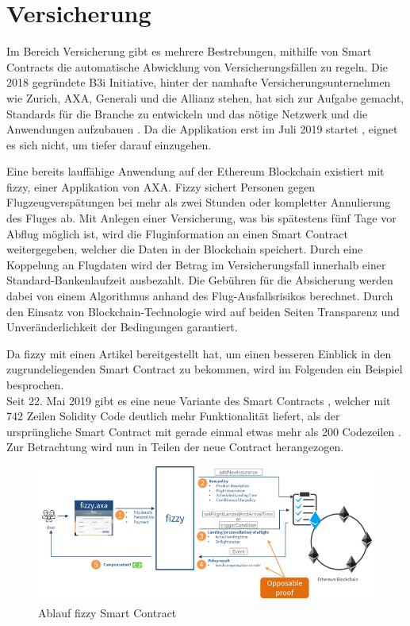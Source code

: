 \chapter{Versicherung}
\label{chap:Versicherung}
Im Bereich Versicherung gibt es mehrere Bestrebungen, mithilfe von Smart Contracts die automatische Abwicklung von Versicherungsfällen zu regeln. Die 2018 gegründete B3i Initiative, hinter der namhafte Versicherungsunternehmen wie Zurich, AXA, Generali und die Allianz stehen, hat sich zur Aufgabe gemacht, Standards für die Branche zu entwickeln und das nötige Netzwerk und die Anwendungen aufzubauen \cite[vgl.][]{B3iWhoWeAre2019}. Da die Applikation erst im Juli 2019 startet \cite[vgl.][]{B3iHackathon2019}, eignet es sich nicht, um tiefer darauf einzugehen.

Eine bereits lauffähige Anwendung auf der Ethereum Blockchain existiert mit fizzy, einer Applikation von AXA. Fizzy sichert Personen gegen Flugzeugverspätungen bei mehr als zwei Stunden oder kompletter Annulierung des Fluges ab. Mit Anlegen einer Versicherung, was bis spätestens fünf Tage vor Abflug möglich ist, wird die Fluginformation an einen Smart Contract weitergegeben, welcher die Daten in der Blockchain speichert. Durch eine Koppelung an Flugdaten wird der Betrag im Versicherungsfall innerhalb einer Standard-Bankenlaufzeit ausbezahlt. Die Gebühren für die Absicherung werden dabei von einem Algorithmus anhand des Flug-Ausfallsrisikos berechnet. Durch den Einsatz von Blockchain-Technologie wird auf beiden Seiten Transparenz und Unveränderlichkeit der Bedingungen garantiert. \cite[vgl.][]{Fizzy2019}

Da fizzy mit \cite{Clement2019} einen Artikel bereitgestellt hat, um einen besseren Einblick in den zugrundeliegenden Smart Contract zu bekommen, wird im Folgenden ein Beispiel besprochen.\\
Seit 22. Mai 2019 gibt es eine neue Variante des Smart Contracts \cite{EtherscanNewContract2019}, welcher mit 742 Zeilen Solidity Code deutlich mehr Funktionalität liefert, als der ursprüngliche Smart Contract mit gerade einmal etwas mehr als 200 Codezeilen \cite{EtherscanOldContract2019}. Zur Betrachtung wird nun in Teilen der neue Contract herangezogen.

\begin{figure}[h!]
  \centering
  \includegraphics[width=\textwidth]{Bilder/fizzyAblauf.png}
  \caption[Ablauf fizzy Smart Contract]{Ablauf fizzy Smart Contract \cite{Clement2019}}
  \label{fig:fizzyAblauf}
\end{figure}

